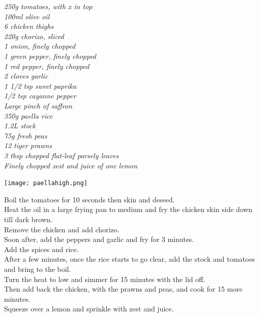 \documentclass{tufte-book}
\begin{document}
\emph{250g tomatoes, with x in top
\\100ml olive oil
\\6 chicken thighs
\\220g chorizo, sliced
\\1 onion, finely chopped
\\1 green pepper, finely chopped
\\1 red pepper, finely chopped
\\2 cloves garlic
\\1 1/2 tsp sweet paprika
\\1/2 tsp cayanne pepper
\\Large pinch of saffron
\\350g paella rice
\\1.2L stock
\\75g fresh peas
\\12 tiger prawns
\\3 tbsp chopped flat-leaf parsely leaves
\\Finely chopped zest and juice of one lemon
}

\begin{marginfigure}%
  \texttt{[image: paellahigh.png]}
\end{marginfigure}

Boil the tomatoes for 10 seconds then skin and deseed.
\\Heat the oil in a large frying pan to medium and fry the chicken skin side down till dark brown.
\\Remove the chicken and add chorizo.
\\Soon after, add the peppers and garlic and fry for 3 minutes.
\\Add the spices and rice.
\\After a few minutes, once the rice starts to go clear, add the stock and tomatoes and bring to the boil.
\\Turn the heat to low and simmer for 15 minutes with the lid off.
\\Then add back the chicken, with the prawns and peas, and cook for 15 more minutes.
\\Squeeze over a lemon and sprinkle with zest and juice.
\end{document}
